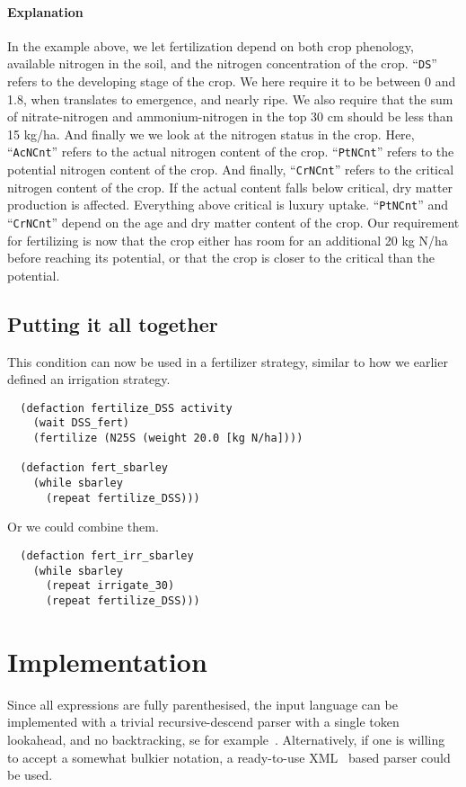 \documentclass[a4paper]{article}
\newcommand{\dname}[1]{``\texttt{#1}''}
\begin{document}
\paragraph{Explanation} In the example above, we let fertilization
depend on both crop phenology, available nitrogen in the soil, and the
nitrogen concentration of the crop.  \dname{DS} refers to the
developing stage of the crop.  We here require it to be between 0 and
1.8, when translates to emergence, and nearly ripe. We also require
that the sum of nitrate-nitrogen and ammonium-nitrogen in the top 30
cm should be less than 15 kg/ha.  And finally we we look at the
nitrogen status in the crop.  Here, \dname{AcNCnt} refers to the
actual nitrogen content of the crop.  \dname{PtNCnt} refers to the
potential nitrogen content of the crop.  And finally, \dname{CrNCnt}
refers to the critical nitrogen content of the crop.  If the actual
content falls below critical, dry matter production is affected.
Everything above critical is luxury uptake.  \dname{PtNCnt} and
\dname{CrNCnt} depend on the age and dry matter content of the crop.
Our requirement for fertilizing is now that the crop either has room
for an additional 20 kg N/ha before reaching its potential, or that
the crop is closer to the critical than the potential.

\subsection{Putting it all together}

This condition can now be used in a fertilizer strategy, similar to
how we earlier defined an irrigation strategy.
\begin{verbatim}
  (defaction fertilize_DSS activity 
    (wait DSS_fert)
    (fertilize (N25S (weight 20.0 [kg N/ha])))

  (defaction fert_sbarley
    (while sbarley
      (repeat fertilize_DSS)))
\end{verbatim}
Or we could combine them.
\begin{verbatim}
  (defaction fert_irr_sbarley
    (while sbarley
      (repeat irrigate_30)
      (repeat fertilize_DSS)))
\end{verbatim}

\section{Implementation}

Since all expressions are fully parenthesised, the input language can
be implemented with a trivial recursive-descend parser with a single
token lookahead, and no backtracking, se for example~\cite{dragon}.
Alternatively, if one is willing to accept a somewhat bulkier
notation, a ready-to-use XML~\cite{XML} based parser could be used.
\end{document}
